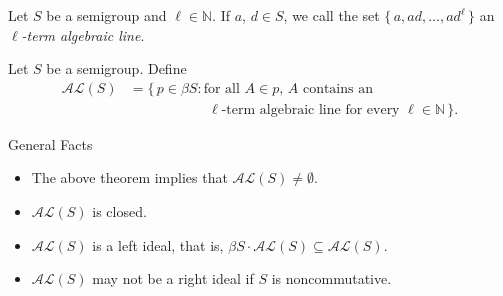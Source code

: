 \documentclass{beamer}
\newcommand{\bbN}{\mathbb{N}}
\begin{document}
\begin{frame}
  \begin{definition}
    Let $S$ be a semigroup and $\ell \in \bbN$. 
    If $a$, $d \in S$, we call the set $\{\, a, ad, \ldots, ad^\ell
    \,\}$ an \textsl{\mbox{$\ell$-term} algebraic line}.
  \end{definition}
\pause
  \begin{definition}
    Let $S$ be a semigroup. 
    Define
    \vspace{-1em}
    \begin{align*}
      \mathcal{AL}(S) &= \{\, p \in \beta S : \mbox{for all $A \in
        p$, $A$ contains an} \\
      &\hspace{5em}\mbox{ $\ell$-term algebraic 
        line for every $\ell \in \bbN$} \,\}.
    \end{align*}
  \end{definition}

  \pause

  \begin{block}{General Facts}
    \begin{itemize}
      \item The above theorem implies that $\mathcal{AL}(S) \ne
        \emptyset$. 
        \pause

      \item  $\mathcal{AL}(S)$ is closed.
        \pause

      \item  $\mathcal{AL}(S)$ is a left ideal, that is, $\beta S \cdot       \mathcal{AL}(S) \subseteq \mathcal{AL}(S)$. 
        \pause

      \item \alert{$\mathcal{AL}(S)$ may not be a right ideal if $S$ is          noncommutative.}
    \end{itemize}
  \end{block}
\end{frame}
\end{document}
